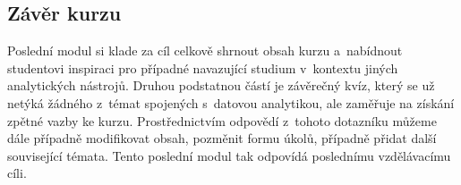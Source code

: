 \hypertarget{zuxe1vux11br-kurzu}{%
\subsection{Závěr kurzu}\label{zuxe1vux11br-kurzu}}

Poslední modul si klade za cíl celkově shrnout obsah kurzu a~nabídnout studentovi inspiraci pro případné navazující studium v~kontextu jiných analytických nástrojů. Druhou podstatnou částí je závěrečný kvíz, který se už netýká žádného z~témat spojených s~datovou analytikou, ale zaměřuje na získání zpětné vazby ke kurzu. Prostřednictvím odpovědí z~tohoto dotazníku můžeme dále případně modifikovat obsah, pozměnit formu úkolů, případně přidat další související témata. Tento poslední modul tak odpovídá poslednímu vzdělávacímu cíli.
